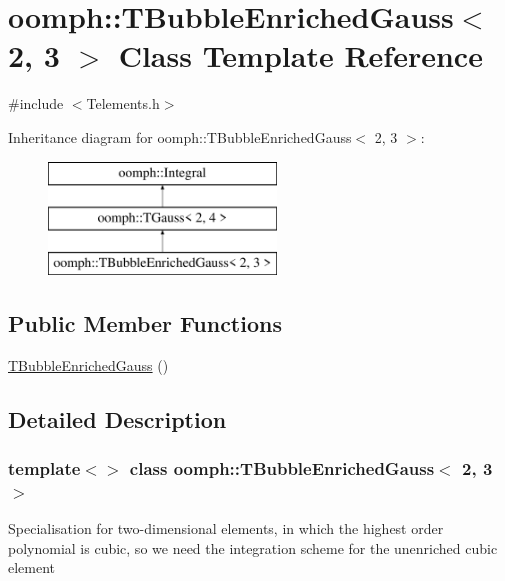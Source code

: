 \hypertarget{classoomph_1_1TBubbleEnrichedGauss_3_012_00_013_01_4}{}\section{oomph\+:\+:T\+Bubble\+Enriched\+Gauss$<$ 2, 3 $>$ Class Template Reference}
\label{classoomph_1_1TBubbleEnrichedGauss_3_012_00_013_01_4}


{\ttfamily \#include $<$Telements.\+h$>$}

Inheritance diagram for oomph\+:\+:T\+Bubble\+Enriched\+Gauss$<$ 2, 3 $>$\+:\begin{figure}[H]
\begin{center}
\leavevmode
\includegraphics[height=3.000000cm]{classoomph_1_1TBubbleEnrichedGauss_3_012_00_013_01_4}
\end{center}
\end{figure}
\subsection*{Public Member Functions}
\begin{DoxyCompactItemize}
\item 
\hyperlink{classoomph_1_1TBubbleEnrichedGauss_3_012_00_013_01_4_a9bdd48b38999607deee7edd9eeb9d691}{T\+Bubble\+Enriched\+Gauss} ()
\end{DoxyCompactItemize}


\subsection{Detailed Description}
\subsubsection*{template$<$$>$\newline
class oomph\+::\+T\+Bubble\+Enriched\+Gauss$<$ 2, 3 $>$}

Specialisation for two-\/dimensional elements, in which the highest order polynomial is cubic, so we need the integration scheme for the unenriched cubic element 

